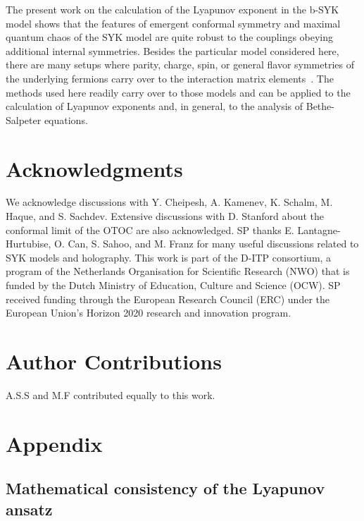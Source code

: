 The present work on the calculation of the Lyapunov exponent in the b-SYK model shows that the features of emergent conformal symmetry and maximal quantum chaos of the SYK model are quite robust to the couplings obeying additional internal symmetries.
Besides the particular model considered here, there are many setups where parity, charge, spin,
or general flavor symmetries of the underlying fermions carry over to the interaction matrix elements~\cite{Chowdhury-RMP2022,Franz2018-review,Kim2019,sahooTraversableWormholeHawkingPage2020,xu_sparse_2020}.
The methods used here readily carry over to those models and can be applied to the calculation of Lyapunov exponents and, in general, to the analysis of Bethe-Salpeter equations.


\section*{Acknowledgments}
	We acknowledge discussions with Y. Cheipesh, A. Kamenev, K. Schalm, M. Haque, and S. Sachdev. Extensive discussions with D. Stanford about the conformal limit of the OTOC are also acknowledged.
	SP thanks E. Lantagne-Hurtubise, O. Can, S. Sahoo, and M. Franz for many useful discussions related to SYK models and holography.  This work is part of the D-ITP consortium,
	a program of the Netherlands Organisation for Scientific Research (NWO) that is funded by the Dutch Ministry of Education, Culture and Science (OCW).
	SP received funding through the European Research Council (ERC) under the European Union's Horizon 2020 research and innovation program.


\section*{Author Contributions}
A.S.S and M.F contributed equally to this work.

\newpage
\section{Appendix}

\subsection{Mathematical consistency of the Lyapunov ansatz}
\label{sec:technical_explanation}

